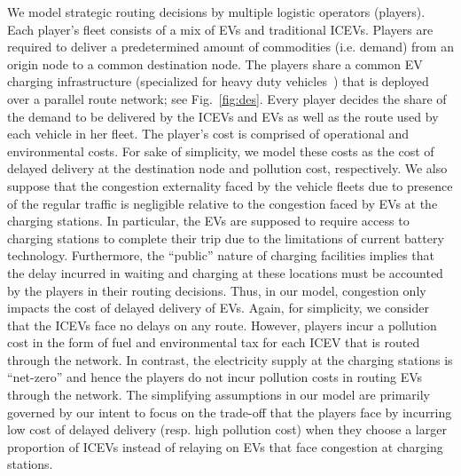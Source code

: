\documentclass[letterpaper, 10 pt, conference]{ieeeconf}  %
\begin{document}
We model strategic routing decisions by multiple logistic operators (players).
Each player's fleet consists of a mix of EVs and traditional ICEVs.
Players are required to deliver a predetermined amount of commodities (i.e. demand) from an origin node to a common destination node.
The players share a common EV charging infrastructure (specialized for heavy duty vehicles~\cite{Al2021Charging}) that is deployed over a parallel route network; see Fig.~\ref{fig:des}.
Every player decides the share of the demand to be delivered by the ICEVs and EVs as well as the route used by each vehicle in her fleet.
The player's cost is comprised of operational and environmental costs.
For sake of simplicity, we model these costs as the cost of delayed delivery at the destination node and pollution cost, respectively.
We also suppose that the congestion externality faced by the vehicle fleets due to presence of the regular traffic is negligible relative to the congestion faced by EVs at the charging stations.
In particular, the EVs are supposed to require access to charging stations to complete their trip due to the limitations of current battery technology.
Furthermore, the ``public'' nature of charging facilities implies that the delay incurred in waiting and charging at these locations must be accounted by the players in their routing decisions.
Thus, in our model, congestion only impacts the cost of delayed delivery of EVs.
Again, for simplicity, we consider that the ICEVs face no delays on any route.
However, players incur a pollution cost in the form of fuel and environmental tax for each ICEV that is routed through the network.
In contrast, the electricity supply at the charging stations is ``net-zero'' and hence the players do not incur pollution costs in routing EVs through the network.
The simplifying assumptions in our model are primarily governed by our intent to focus on the trade-off that the players face by incurring low cost of delayed delivery (resp. high pollution cost) when they choose a larger proportion of ICEVs instead of relaying on EVs that face congestion at charging stations.
\end{document}
